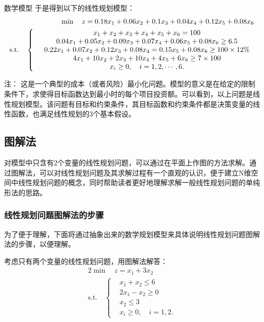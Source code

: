 \begin{frame}{\subsecname}
  
    \begin{block}{数学模型}  
    于是得到以下的线性规划模型：
\begin{alignat}{2}
\min\quad  z=0.18x_1+0.06x_2+0.1x_3+0.04x_4+0.12x_5+0.08x_6 \nonumber\\
\mbox{s.t.}\quad
\left\{
\begin{array}{cc}\nonumber
     & x_1+x_2+x_3+x_4+x_5+x_6=100 \\
     & 0.04x_1+0.05x_2+0.09x_3+0.07x_4+0.06x_5+0.08x_6 \ge 6.5\\
     & 0.22x_1+0.07x_2+0.12x_3+0.08x_4=0.15x_5+0.08x_6 \ge 100\times 12\% \\
     & 4x_1+10x_2+2x_3+10x_4+4x_5+6x_6 \ge 7 \times 100 \\
     & x_i \ge 0, \quad i=1,2,\cdots, 6.
\end{array}
\right.
\end{alignat}
\end{block}

\begin{alertblock}{注：}
  这是一个典型的成本（或者风险）最小化问题。模型的意义是在给定的限制条件下，求使得目标函数达到最小时的每个项目投资额。可以看到，以上问题是线性规划模型。该问题有目标和约束条件，其目标函数和约束条件都是决策变量的线性函数，也满足线性规划的3个基本假设。
\end{alertblock}

\end{frame}

\subsection{图解法}
\begin{frame}{\subsecname}
    对模型中只含有2个变量的线性规划问题，可以通过在平面上作图的方法求解。通过图解法，可以对线性规划问题及其求解过程有一个直观的认识，便于建立N维空间中线性规划问题的概念，同时帮助读者更好地理解求解一般线性规划问题的单纯形法的思路。
\end{frame}

\subsubsection{线性规划问题图解法的步骤}
\begin{frame}{\subsubsecname}
    为了便于理解，下面将通过抽象出来的数学规划模型来具体说明线性规划问题图解法的步骤，以便理解。
    \begin{example}[例2-3] 
    考虑只有两个变量的线性规划问题，用图解法解答：
    \begin{alignat}{2}
\min\quad  z=x_1+3x_2 \nonumber\\
\mbox{s.t.}\quad
\left\{
\begin{array}{cc}\nonumber
     & x_1+x_2 \le 6 \\
     & 2x_1-x_2 \ge 0\\
     & x_2 \le 3\\
     & x_i \ge 0, \quad i=1,2.
\end{array}
\right.
\end{alignat}
    \end{example}
\end{frame}


